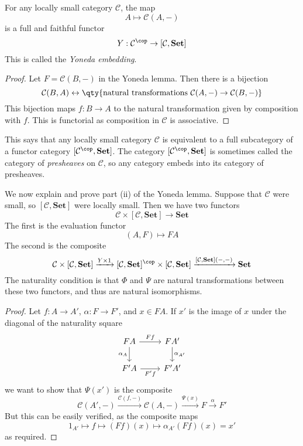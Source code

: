 \begin{corollary}
    For any locally small category \( \mathcal C \), the map
    \[ A \mapsto \mathcal C(A, -) \]
    is a full and faithful functor
    \[ Y : \mathcal C^\cop \to [\mathcal C, \mathbf{Set}] \]
    This is called the \emph{Yoneda embedding}.
\end{corollary}
\begin{proof}
    Let \( F = \mathcal C(B, -) \) in the Yoneda lemma.
    Then there is a bijection
    \[ \mathcal C(B, A) \leftrightarrow \qty{\text{natural transformations } \mathcal C(A, -) \to \mathcal C(B, -)} \]
    This bijection maps \( f : B \to A \) to the natural transformation given by composition with \( f \).
    This is functorial as composition in \( \mathcal C \) is associative.
\end{proof}
This says that any locally small category \( \mathcal C \) is equivalent to a full subcategory of a functor category \( [\mathcal C^\cop, \mathbf{Set}] \).
The category \( [\mathcal C^\cop, \mathbf{Set}] \) is sometimes called the category of \emph{presheaves} on \( \mathcal C \), so any category embeds into its category of presheaves.

We now explain and prove part (ii) of the Yoneda lemma.
Suppose that \( \mathcal C \) were small, so \( [\mathcal C, \mathbf{Set}] \) were locally small.
Then we have two functors
\[ \mathcal C \times [\mathcal C, \mathbf{Set}] \to \mathbf{Set} \]
The first is the evaluation functor
\[ (A, F) \mapsto FA \]
The second is the composite
\[ \mathcal C \times [\mathcal C, \mathbf{Set}] \xrightarrow{Y \times 1} [\mathcal C, \mathbf{Set}]^\cop \times [\mathcal C, \mathbf{Set}] \xrightarrow{[\mathcal C, \mathbf{Set}](-, -)} \mathbf{Set} \]
The naturality condition is that \( \Phi \) and \( \Psi \) are natural transformations between these two functors, and thus are natural isomorphisms.
\begin{proof}
    Let \( f : A \to A' \), \( \alpha : F \to F' \), and \( x \in F A \).
    If \( x' \) is the image of \( x \) under the diagonal of the naturality square
    \[\begin{tikzcd}
        FA & {FA'} \\
        {F'A} & {F'A'}
        \arrow["Ff", from=1-1, to=1-2]
        \arrow["{\alpha_{A'}}", from=1-2, to=2-2]
        \arrow["{\alpha_A}"', from=1-1, to=2-1]
        \arrow["{F'f}"', from=2-1, to=2-2]
    \end{tikzcd}\]
    we want to show that \( \Psi(x') \) is the composite
    \[ \mathcal C(A', -) \xrightarrow{\mathcal C(f, -)} \mathcal C(A, -) \xrightarrow{\Psi(x)} F \xrightarrow \alpha F' \]
    But this can be easily verified, as the composite maps
    \[ 1_{A'} \mapsto f \mapsto (Ff)(x) \mapsto \alpha_{A'}(Ff)(x) = x' \]
    as required.
\end{proof}

